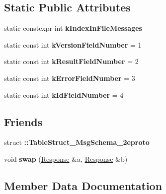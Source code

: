 \subsection*{Static Public Attributes}
\begin{DoxyCompactItemize}
\item 
static constexpr int {\bfseries k\+Index\+In\+File\+Messages}
\item 
\mbox{\label{classcoappbrpc_1_1Response_a419e8532ffd97e6bab8cdcf27d31203f}} 
static const int {\bfseries k\+Version\+Field\+Number} = 1
\item 
\mbox{\label{classcoappbrpc_1_1Response_a0132ee8e4087c92e607c548d46474964}} 
static const int {\bfseries k\+Result\+Field\+Number} = 2
\item 
\mbox{\label{classcoappbrpc_1_1Response_ae7fdafbc86f89e117a6760c67eb3d9c2}} 
static const int {\bfseries k\+Error\+Field\+Number} = 3
\item 
\mbox{\label{classcoappbrpc_1_1Response_ab1099b6e840365727c22e8bbe79f979a}} 
static const int {\bfseries k\+Id\+Field\+Number} = 4
\end{DoxyCompactItemize}
\subsection*{Friends}
\begin{DoxyCompactItemize}
\item 
\mbox{\label{classcoappbrpc_1_1Response_a65c087bf06ded9c9be363691f7b7bafa}} 
struct {\bfseries \+::\+Table\+Struct\+\_\+\+Msg\+Schema\+\_\+2eproto}
\item 
\mbox{\label{classcoappbrpc_1_1Response_abd2d29760e9668486937c4d6f11784e6}} 
void {\bfseries swap} (\hyperlink{classcoappbrpc_1_1Response}{Response} \&a, \hyperlink{classcoappbrpc_1_1Response}{Response} \&b)
\end{DoxyCompactItemize}


\subsection{Member Data Documentation}
\mbox{\label{classcoappbrpc_1_1Response_ae8e167e80cc311e00980ac897decdceb}} 
